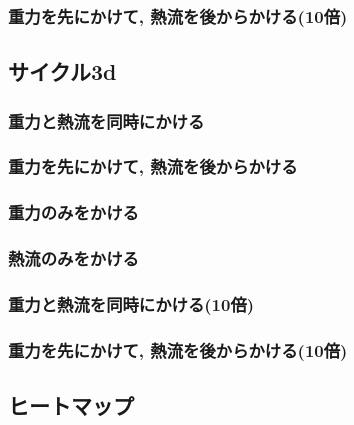 

\subsubsection{重力を先にかけて, 熱流を後からかける(10倍)}



\subsection{サイクル3d}

\subsubsection{重力と熱流を同時にかける}



\subsubsection{重力を先にかけて, 熱流を後からかける}



\subsubsection{重力のみをかける}



\subsubsection{熱流のみをかける}



\subsubsection{重力と熱流を同時にかける(10倍)}



\subsubsection{重力を先にかけて, 熱流を後からかける(10倍)}




\subsection{ヒートマップ}

